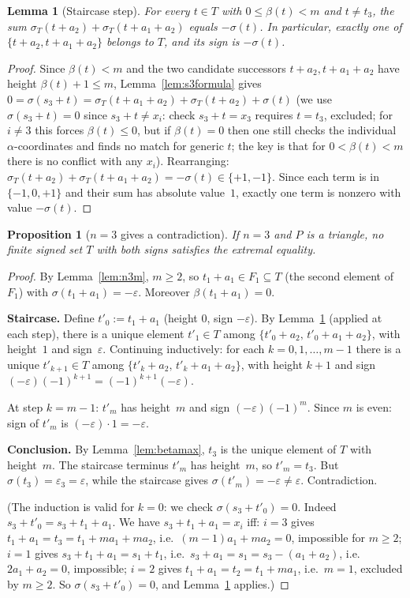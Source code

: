 \documentclass{article}
\newtheorem{lemma}{Lemma}
\newtheorem{prop}{Proposition}
\begin{document}
\begin{lemma}[Staircase step]\label{lem:step}
For every $t\in T$ with $0\le\beta(t)<m$ and $t\ne t_3$,
the sum $\sigma_T(t+a_2)+\sigma_T(t+a_1+a_2)$ equals $-\sigma(t)$.
In particular, exactly one of $\{t+a_2,t+a_1+a_2\}$ belongs to $T$, and its sign
is $-\sigma(t)$.
\end{lemma}
\begin{proof}
Since $\beta(t)<m$ and the two candidate successors $t+a_2,t+a_1+a_2$ have
height $\beta(t)+1\le m$, Lemma~\ref{lem:s3formula} gives
$0=\sigma(s_3+t)=\sigma_T(t+a_1+a_2)+\sigma_T(t+a_2)+\sigma(t)$
(we use $\sigma(s_3+t)=0$ since $s_3+t\ne x_i$: check $s_3+t=x_3$ requires $t=t_3$,
excluded; for $i\ne 3$ this forces $\beta(t)\le 0$, but if $\beta(t)=0$ then one still
checks the individual $\alpha$-coordinates and finds no match for generic $t$;
the key is that for $0<\beta(t)<m$ there is no conflict with any $x_i$).
Rearranging: $\sigma_T(t+a_2)+\sigma_T(t+a_1+a_2)=-\sigma(t)\in\{+1,-1\}$.
Since each term is in $\{-1,0,+1\}$ and their sum has absolute value~$1$,
exactly one term is nonzero with value $-\sigma(t)$.
\end{proof}

\begin{prop}[$n=3$ gives a contradiction]\label{prop:n3}
If $n=3$ and $P$ is a triangle, no finite signed set $T$ with both signs satisfies the
extremal equality.
\end{prop}
\begin{proof}
By Lemma~\ref{lem:n3m}, $m\ge 2$, so $t_1+a_1\in F_1\subseteq T$
(the second element of $F_1$) with $\sigma(t_1+a_1)=-\varepsilon$.
Moreover $\beta(t_1+a_1)=0$.

\textbf{Staircase.}
Define $t'_0:=t_1+a_1$ (height $0$, sign $-\varepsilon$).
By Lemma~\ref{lem:step} (applied at each step), there is a unique element
$t'_1\in T$ among $\{t'_0+a_2,\,t'_0+a_1+a_2\}$, with height~$1$ and sign~$\varepsilon$.
Continuing inductively: for each $k=0,1,\dots,m-1$ there is a unique
$t'_{k+1}\in T$ among $\{t'_k+a_2,\,t'_k+a_1+a_2\}$,
with height $k+1$ and sign $(-\varepsilon)(-1)^{k+1}=(-1)^{k+1}(-\varepsilon)$.

At step $k=m-1$: $t'_m$ has height~$m$ and sign $(-\varepsilon)(-1)^m$.
Since $m$ is even: sign of $t'_m$ is $(-\varepsilon)\cdot 1=-\varepsilon$.

\textbf{Conclusion.}
By Lemma~\ref{lem:betamax}, $t_3$ is the unique element of $T$ with height~$m$.
The staircase terminus $t'_m$ has height~$m$, so $t'_m=t_3$.
But $\sigma(t_3)=\varepsilon_3=\varepsilon$, while the staircase gives $\sigma(t'_m)=-\varepsilon\ne\varepsilon$.
Contradiction.

(The induction is valid for $k=0$: we check $\sigma(s_3+t'_0)=0$.
Indeed $s_3+t'_0=s_3+t_1+a_1$.  We have $s_3+t_1+a_1=x_i$ iff:
$i=3$ gives $t_1+a_1=t_3=t_1+ma_1+ma_2$, i.e.\ $(m-1)a_1+ma_2=0$, impossible for $m\ge 2$;
$i=1$ gives $s_3+t_1+a_1=s_1+t_1$, i.e.\ $s_3+a_1=s_1=s_3-(a_1+a_2)$, i.e.\ $2a_1+a_2=0$, impossible;
$i=2$ gives $t_1+a_1=t_2=t_1+ma_1$, i.e.\ $m=1$, excluded by $m\ge 2$.
So $\sigma(s_3+t'_0)=0$, and Lemma~\ref{lem:step} applies.)
\end{proof}
\end{document}
